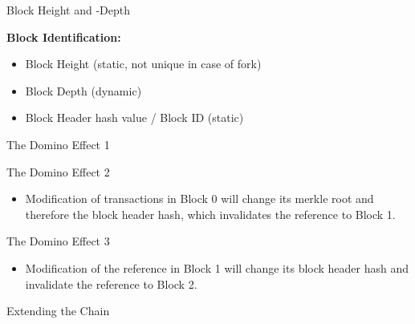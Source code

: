 \documentclass[]{beamer}
\begin{document}
\begin{frame}{Block Height and -Depth}
	\begin{figure}
		
	\end{figure}
\textbf{Block Identification:}
	\begin{itemize}
 		\item Block Height (static, not unique in case of fork)
 		\item Block Depth (dynamic)
 		\item Block Header hash value / Block ID (static)
	\end{itemize}
\end{frame}


\begin{frame}{The Domino Effect 1}
	\begin{figure}
		
	\end{figure}
\end{frame}


\begin{frame}{The Domino Effect 2}
	\begin{figure}
		
	\end{figure}
	\begin{itemize}
		\item Modification of transactions in Block 0 will change its merkle root and therefore the block header hash, which invalidates the reference to Block 1.
	\end{itemize}
\end{frame}


\begin{frame}{The Domino Effect 3}
	\begin{figure}
		
	\end{figure}
	\begin{itemize}
		\item Modification of the reference in Block 1 will change its block header hash and invalidate the reference to Block 2.
	\end{itemize}
\end{frame}


\begin{frame}{Extending the Chain}
	\begin{figure}[h!]
	\center
		
	\end{figure}
\vspace{1em}
\end{frame}

\end{document}
